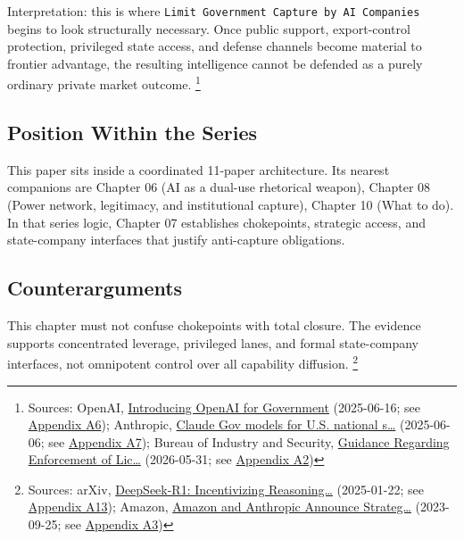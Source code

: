 \documentclass[
  american,
  11pt,
  letterpaper,
]{article}
\begin{document}
Interpretation: this is where
\texttt{Limit\ Government\ Capture\ by\ AI\ Companies} begins to look
structurally necessary. Once public support, export-control protection,
privileged state access, and defense channels become material to
frontier advantage, the resulting intelligence cannot be defended as a
purely ordinary private market outcome. \footnote{Sources: OpenAI,
  \href{https://openai.com/global-affairs/introducing-openai-for-government/}{Introducing
  OpenAI for Government} (2025-06-16; see
  \hyperref[ch-07-appendix-a6-introducing-openai-for-government]{Appendix
  A6}); Anthropic,
  \href{https://www.anthropic.com/news/claude-gov-models-for-u-s-national-security-customers}{Claude
  Gov models for U.S. national s\ldots{}} (2025-06-06; see
  \hyperref[ch-07-appendix-a7-claude-gov-models-for-u-s-national-security-customers]{Appendix
  A7}); Bureau of Industry and Security,
  \href{https://www.bis.gov/media/documents/bis-guidance-may-31-2026.pdf}{Guidance
  Regarding Enforcement of Lic\ldots{}} (2026-05-31; see
  \hyperref[ch-07-appendix-a2-guidance-regarding-enforcement-of-license-requirements-for-advanced-computing-items-for-entities-headquartered-in-country-group-d-5-and-macau]{Appendix
  A2})}

\subsection{Position Within the
Series}\label{position-within-the-series-7}

This paper sits inside a coordinated 11-paper architecture. Its nearest
companions are Chapter 06 (AI as a dual-use rhetorical weapon), Chapter
08 (Power network, legitimacy, and institutional capture), Chapter 10
(What to do). In that series logic, Chapter 07 establishes chokepoints,
strategic access, and state-company interfaces that justify anti-capture
obligations.

\subsection{Counterarguments}\label{counterarguments-7}

This chapter must not confuse chokepoints with total closure. The
evidence supports concentrated leverage, privileged lanes, and formal
state-company interfaces, not omnipotent control over all capability
diffusion. \footnote{Sources: arXiv,
  \href{https://arxiv.org/abs/2501.12948}{DeepSeek-R1: Incentivizing
  Reasoning\ldots{}} (2025-01-22; see
  \hyperref[ch-07-appendix-a13-deepseek-r1-incentivizing-reasoning-capability-in-llms-via-reinforcement-learning]{Appendix
  A13}); Amazon,
  \href{https://press.aboutamazon.com/2023/9/amazon-and-anthropic-announce-strategic-collaboration-to-advance-generative-ai}{Amazon
  and Anthropic Announce Strateg\ldots{}} (2023-09-25; see
  \hyperref[ch-07-appendix-a3-amazon-and-anthropic-announce-strategic-collaboration-to-advance-generative-ai]{Appendix
  A3})}
\end{document}
